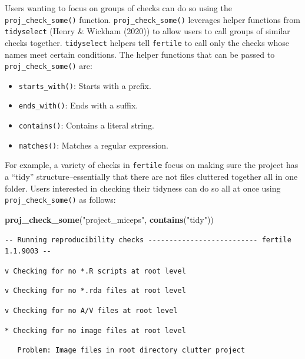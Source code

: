 \documentclass[12pt,twoside]{reedthesis}
\newenvironment{Shaded}{\begin{snugshade}}{\end{snugshade}}
\newcommand{\KeywordTok}[1]{\textcolor[rgb]{0.13,0.29,0.53}{\textbf{#1}}}
\newcommand{\NormalTok}[1]{#1}
\newcommand{\StringTok}[1]{\textcolor[rgb]{0.31,0.60,0.02}{#1}}
\providecommand{\tightlist}{%
  \setlength{\itemsep}{0pt}\setlength{\parskip}{0pt}}
\begin{document}
Users wanting to focus on groups of checks can do so using the \texttt{proj\_check\_some()} function.
\texttt{proj\_check\_some()} leverages helper functions from \texttt{tidyselect} (Henry \& Wickham (2020)) to allow users to call groups of similar checks together. \texttt{tidyselect} helpers tell \texttt{fertile} to call only the checks whose names meet certain conditions. The helper functions that can be passed to \texttt{proj\_check\_some()} are:
\begin{itemize}
\tightlist
\item
  \texttt{starts\_with()}: Starts with a prefix.
\item
  \texttt{ends\_with()}: Ends with a suffix.
\item
  \texttt{contains()}: Contains a literal string.
\item
  \texttt{matches()}: Matches a regular expression.
\end{itemize}
For example, a variety of checks in \texttt{fertile} focus on making sure the project has a ``tidy'' structure--essentially that there are not files cluttered together all in one folder. Users interested in checking their tidyness can do so all at once using \texttt{proj\_check\_some()} as follows:
\begin{Shaded}
\begin{Highlighting}[]
\KeywordTok{proj_check_some}\NormalTok{(}\StringTok{"project_miceps"}\NormalTok{, }\KeywordTok{contains}\NormalTok{(}\StringTok{"tidy"}\NormalTok{))}
\end{Highlighting}
\end{Shaded}
\begin{verbatim}
-- Running reproducibility checks -------------------------- fertile 1.1.9003 --
\end{verbatim}
\begin{verbatim}
v Checking for no *.R scripts at root level
\end{verbatim}
\begin{verbatim}
v Checking for no *.rda files at root level
\end{verbatim}
\begin{verbatim}
v Checking for no A/V files at root level
\end{verbatim}
\begin{verbatim}
* Checking for no image files at root level
\end{verbatim}
\begin{verbatim}
   Problem: Image files in root directory clutter project
\end{verbatim}
\end{document}
